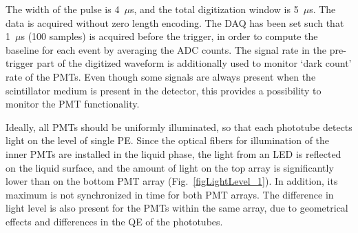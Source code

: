 The width of the pulse is 4~$\mu$s, and the total digitization window is 5~$\mu$s. The data is acquired without zero length encoding. The DAQ has been set such that 1~$\mu$s (100 samples) is acquired before the trigger, in order to compute the baseline for each event by averaging the ADC counts. 
The signal rate in the pre-trigger part of the digitized waveform is additionally used to monitor `dark count' rate of the PMTs. Even though some signals are always present when the scintillator medium is present in the detector, this provides a possibility to monitor the PMT functionality. 

Ideally, all PMTs should be uniformly illuminated, so that each phototube detects light on the level of single PE. Since the optical fibers for illumination of the inner PMTs are installed in the liquid phase, the light from an LED is reflected on the liquid surface, and the amount of light on the top array is significantly lower than on the bottom PMT array (Fig.~\ref{figLightLevel_1}). In addition, its maximum is not synchronized in time for both PMT arrays. The difference in light level is also present for the PMTs within the same array, due to geometrical effects and differences in the QE of the phototubes.

